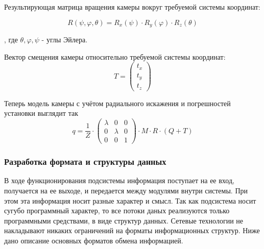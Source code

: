 Результирующая матрица вращения камеры вокруг требуемой системы координат:

$$ R(\psi , \varphi , \theta ) = R_x(\psi ) \cdot R_y(\varphi ) \cdot R_z(\theta ) $$

, где $ \theta , \varphi , \psi $ - углы Эйлера.

Вектор смещения камеры относительно требуемой системы координат:
$$ 
T = 
\left( 
\begin{array}{c}
t_x \\ 
t_y \\ 
t_z
\end{array} 
\right) 
$$ 

Теперь модель камеры с учётом радиального искажения и погрешностей установки выглядит так\cite{cameraCalibrate}
$$
q = \frac{1}{Z} \cdot \left( 
\begin{array}{ccc}
	\lambda & 0 & 0 \\ 
	0 & \lambda & 0 \\ 
	0 & 0 & 1
\end{array} 
\right) 
 \cdot M \cdot R \cdot (Q + T)
$$

\subsubsection{Разработка формата и структуры данных}
В ходе функционирования подсистемы информация поступает на ее вход, получается на ее выходе, и передается между модулями внутри системы. 
При этом эта информация носит разные характер и смысл. Так как подсистема носит сугубо программный характер, то все потоки даных реализуются только программными средствами, в виде структур данных. Сетевые технологии не накладывают никаких ограничений на форматы информационных структур. 
Ниже дано описание основных форматов обмена информацией.

